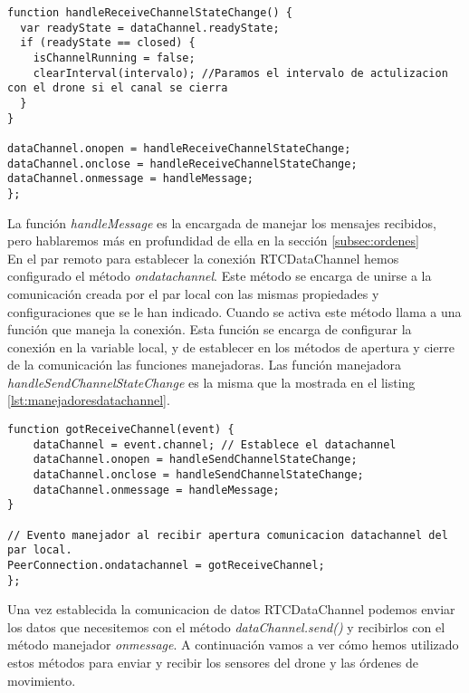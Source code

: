 \begin{lstlisting}[caption=Manejadores de RTCdataChannlel.]
function handleReceiveChannelStateChange() {
  var readyState = dataChannel.readyState;
  if (readyState == closed) {
    isChannelRunning = false;
    clearInterval(intervalo); //Paramos el intervalo de actulizacion con el drone si el canal se cierra
  }
}

dataChannel.onopen = handleReceiveChannelStateChange;
dataChannel.onclose = handleReceiveChannelStateChange;
dataChannel.onmessage = handleMessage;
};\end{lstlisting}

La función \emph{handleMessage} es la encargada de manejar los mensajes recibidos, pero hablaremos más en profundidad de ella en la sección \ref{subsec:ordenes}\\

En el par remoto para establecer la conexión RTCDataChannel hemos configurado el método \emph{ondatachannel}. Este método se encarga de unirse a la comunicación creada por el par local con las mismas propiedades y configuraciones que se le han indicado. Cuando se activa este método llama a una función que maneja la conexión. Esta función se encarga de configurar la conexión en la variable local, y de establecer en los métodos de apertura y cierre de la comunicación las funciones manejadoras. Las función manejadora \emph{handleSendChannelStateChange} es la misma que la mostrada en el listing \ref{lst:manejadoresdatachannel}.\\

\begin{lstlisting}[caption={Establecimiento de RTCDataChannlel en el par remoto.}, label={lst:manejadoresdatachannel}]
function gotReceiveChannel(event) {
	dataChannel = event.channel; // Establece el datachannel
	dataChannel.onopen = handleSendChannelStateChange;
	dataChannel.onclose = handleSendChannelStateChange;
	dataChannel.onmessage = handleMessage;
}

// Evento manejador al recibir apertura comunicacion datachannel del par local.
PeerConnection.ondatachannel = gotReceiveChannel;
};\end{lstlisting}

Una vez establecida la comunicacion de datos RTCDataChannel podemos enviar los datos que necesitemos con el método \emph{dataChannel.send()} y recibirlos con el método manejador \emph{onmessage}. A continuación vamos a ver cómo hemos utilizado estos métodos para enviar y recibir los sensores del drone y las órdenes de movimiento.\\


